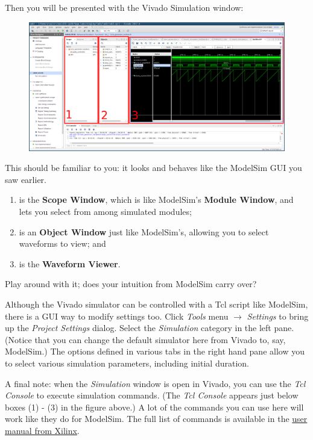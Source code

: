 \documentclass[11pt]{article}
\begin{document}
Then you will be presented with the Vivado Simulation window:

\begin{figure}[H]
	\centerline{\includegraphics[width=\textwidth]{figs/vivado_xsim.png}}
\end{figure}

This should be familiar to you: it looks and behaves like the ModelSim GUI you saw earlier.

\begin{enumerate}
  \item is the \textbf{Scope Window}, which is like ModelSim's \textbf{Module Window}, and lets you select from among simulated modules;
  \item is an \textbf{Object Window} just like ModelSim's, allowing you to select waveforms to view; and
  \item is the \textbf{Waveform Viewer}.
\end{enumerate}

Play around with it; does your intuition from ModelSim carry over?

Although the Vivado simulator can be controlled with a Tcl script like ModelSim, there is a GUI way to modify settings too. Click \emph{Tools} menu $\rightarrow$ \emph{Settings} to bring up the \emph{Project Settings} dialog. Select the \emph{Simulation} category in the left pane. (Notice that you can change the default simulator here from Vivado to, say, ModelSim.) The options defined in various tabs in the right hand pane allow you to select various simulation parameters, including initial duration.

A final note: when the \emph{Simulation} window is open in Vivado, you can use the \emph{Tcl Console} to execute simulation commands. (The \emph{Tcl Console} appears just below boxes (1) - (3) in the figure above.) A lot of the commands you can use here will work like they do for ModelSim. The full list of commands is available in the \href{https://www.xilinx.com/support/documentation/sw_manuals/xilinx2016_1/ug937-vivado-design-suite-simulation-tutorial.pdf}{user manual from Xilinx}.
\end{document}
